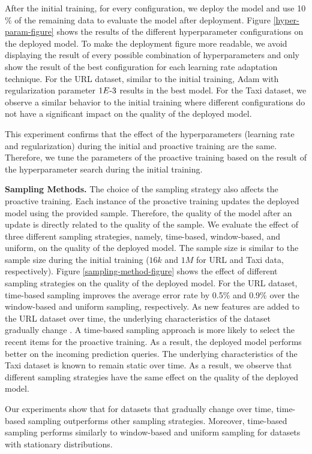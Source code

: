 After the initial training, for every configuration, we deploy the model and use 10 \% of the remaining data to evaluate the model after deployment.
Figure \ref{hyper-param-figure} shows the results of the different hyperparameter configurations on the deployed model.
To make the deployment figure more readable, we avoid displaying the result of every possible combination of hyperparameters and only show the result of the best configuration for each learning rate adaptation technique.
For the URL dataset, similar to the initial training, Adam with regularization parameter $1E{\text -}3$ results in the best model.
For the Taxi dataset, we observe a similar behavior to the initial training where different configurations do not have a significant impact on the quality of the deployed model.

This experiment confirms that the effect of the hyperparameters (learning rate and regularization) during the initial and proactive training are the same.
Therefore, we tune the parameters of the proactive training based on the result of the hyperparameter search during the initial training.

\textbf{Sampling Methods.}
The choice of the sampling strategy also affects the proactive training.
Each instance of the proactive training updates the deployed model using the provided sample.
Therefore, the quality of the model after an update is directly related to the quality of the sample.
We evaluate the effect of three different sampling strategies, namely, time-based, window-based, and uniform, on the quality of the deployed model.
The sample size is similar to the sample size during the initial training ($16k$ and $1M$ for URL and Taxi data, respectively).
Figure \ref{sampling-method-figure} shows the effect of different sampling strategies on the quality of the deployed model.
For the URL dataset, time-based sampling improves the average error rate by 0.5\% and 0.9\% over the window-based and uniform sampling, respectively.
As new features are added to the URL dataset over time, the underlying characteristics of the dataset gradually change \cite{ma2009identifying}.
A time-based sampling approach is more likely to select the recent items for the proactive training.
As a result, the deployed model performs better on the incoming prediction queries.
The underlying characteristics of the Taxi dataset is known to remain static over time.
As a result, we observe that different sampling strategies have the same effect on the quality of the deployed model.

Our experiments show that for datasets that gradually change over time, time-based sampling outperforms other sampling strategies.
Moreover, time-based sampling performs similarly to window-based and uniform sampling for datasets with stationary distributions.
